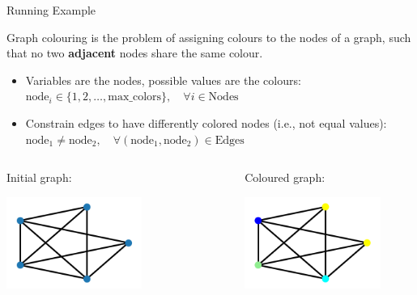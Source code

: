 \documentclass{cons-beamer}
\begin{document}
\begin{frame}{Running Example}
  \begin{example}
    \footnotesize	
    Graph colouring is the problem of assigning colours to the nodes of a graph, such that no two \textbf{adjacent} nodes share the same colour. 

    \begin{itemize}
      \item Variables are the nodes, possible values are the colours: 
            $\text{node}_i \in \{1, 2, \dots, \text{max\_colors}\}, \quad \forall i \in \text{Nodes}$
      \item Constrain edges to have differently colored nodes (i.e., not equal values):
            $\text{node}_{1} \neq \text{node}_{2}, \quad \forall (\text{node}_1, \text{node}_2) \in \text{Edges}$ 
    \end{itemize}
  \end{example}

  \vspace{-0.4cm}
  \footnotesize	
  \begin{columns}
    \begin{column}{0.45\textwidth}
      \begin{center}
        Initial graph:

        \includegraphics[height=30mm]{images/texpl_img/graph_not_coloured.png}
      \end{center}
    \end{column}
    \begin{column}{0.1\textwidth}
      \begin{center}
      \end{center}
    \end{column}
    \begin{column}{0.45\textwidth}
      \begin{center}
        Coloured graph:

        \includegraphics[height=30mm]{images/texpl_img/graph_coloured.png}
      \end{center}    
    \end{column}
  \end{columns}
\end{frame}
\end{document}
